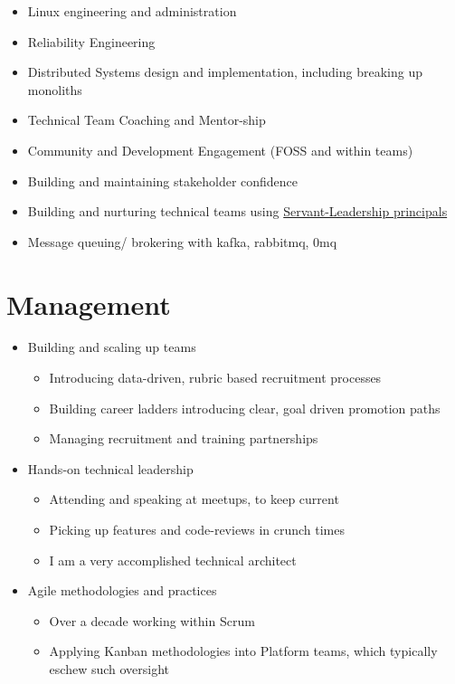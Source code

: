 \documentclass[11pt,a4paper,sans]{article}
\begin{document}
\begin{itemize}
\item Linux engineering and administration
\item Reliability Engineering
\item Distributed Systems design and implementation, including breaking up monoliths
\item Technical Team Coaching and Mentor-ship
\item Community and Development Engagement (FOSS and within teams)
\item Building and maintaining stakeholder confidence
\item Building and nurturing technical teams using \href{https://www.mindtools.com/pages/article/servant-leadership.htm}{Servant-Leadership principals}
\item Message queuing/ brokering with kafka, rabbitmq, 0mq
\end{itemize}

\section{Management}

\begin{itemize}
\item Building and scaling up teams
  \begin{itemize}
  \item Introducing data-driven, rubric based recruitment processes
  \item Building career ladders introducing clear, goal driven promotion paths
  \item Managing recruitment and training partnerships
  \end{itemize}
\item Hands-on technical leadership
  \begin{itemize}
  \item Attending and speaking at meetups, to keep current
  \item Picking up features and code-reviews in crunch times
  \item I am a very accomplished technical architect
  \end{itemize}
\item Agile methodologies and practices
  \begin{itemize}
  \item Over a decade working within Scrum
  \item Applying Kanban methodologies into Platform teams, which typically eschew such oversight
  \end{itemize}
\end{itemize}
\end{document}
